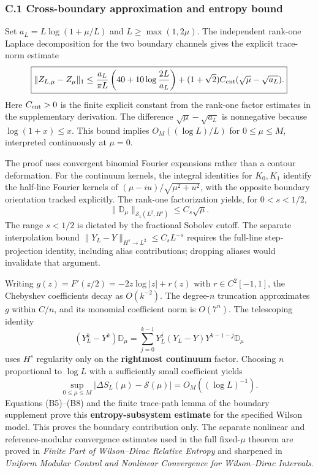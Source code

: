 \documentclass[
  10pt,
  a4paper,
]{article}
\begin{document}
\subsubsection{C.1 Cross-boundary approximation and entropy bound}\label{c.1-cross-boundary-approximation-and-entropy-bound}

Set \(a_L=L\log(1+\mu/L)\) and \(L\ge\max(1,2\mu)\). The independent rank-one Laplace decomposition for the two boundary channels gives the explicit trace-norm estimate \[\boxed{\|Z_{L,\mu}-Z_\mu\|_1\le\frac{a_L}{\pi L}\left(40+10\log\frac{2L}{a_L}\right)+(1+\sqrt2)C_{\rm ent}(\sqrt\mu-\sqrt{a_L}).}\] Here \(C_{\rm ent}>0\) is the finite explicit constant from the rank-one factor estimates in the supplementary derivation. The difference \(\sqrt\mu-\sqrt{a_L}\) is nonnegative because \(\log(1+x)\le x\). This bound implies \(O_M((\log L)/L)\) for \(0\le\mu\le M\), interpreted continuously at \(\mu=0\).

The proof uses convergent binomial Fourier expansions rather than a contour deformation. For the continuum kernels, the integral identities for \(K_0,K_1\) identify the half-line Fourier kernels of \((\mu-iu)/\sqrt{\mu^2+u^2}\), with the opposite boundary orientation tracked explicitly. The rank-one factorization yields, for \(0<s<1/2\), \[\|\mathbb D_\mu\|_{\mathcal S_1(L^2,H^s)}\le C_s\sqrt\mu.\] The range \(s<1/2\) is dictated by the fractional Sobolev cutoff. The separate interpolation bound \(\|Y_L-Y\|_{H^s\to L^2}\le C_sL^{-s}\) requires the full-line step-projection identity, including alias contributions; dropping aliases would invalidate that argument.

Writing \(g(z)=F'(z/2)=-2z\log|z|+r(z)\) with \(r\in C^2[-1,1]\), the Chebyshev coefficients decay as \(O(k^{-2})\). The degree-\(n\) truncation approximates \(g\) within \(C/n\), and its monomial coefficient norm is \(O(7^n)\). The telescoping identity \[ (Y_L^k-Y^k)\mathbb D_\mu=\sum_{j=0}^{k-1}Y_L^j(Y_L-Y)Y^{k-1-j}\mathbb D_\mu \] uses \(H^s\) regularity only on the \textbf{rightmost continuum} factor. Choosing \(n\) proportional to \(\log L\) with a sufficiently small coefficient yields \[ \sup_{0\le\mu\le M}|\Delta S_L(\mu)-\mathcal S(\mu)|=O_M((\log L)^{-1}). \] Equations (B5)--(B8) and the finite trace-path lemma of the boundary supplement prove this \textbf{entropy-subsystem estimate} for the specified Wilson model. This proves the boundary contribution only. The separate nonlinear and reference-modular convergence estimates used in the full fixed-\(\mu\) theorem are proved in \emph{Finite Part of Wilson--Dirac Relative Entropy} and sharpened in \emph{Uniform Modular Control and Nonlinear Convergence for Wilson--Dirac Intervals}.
\end{document}

